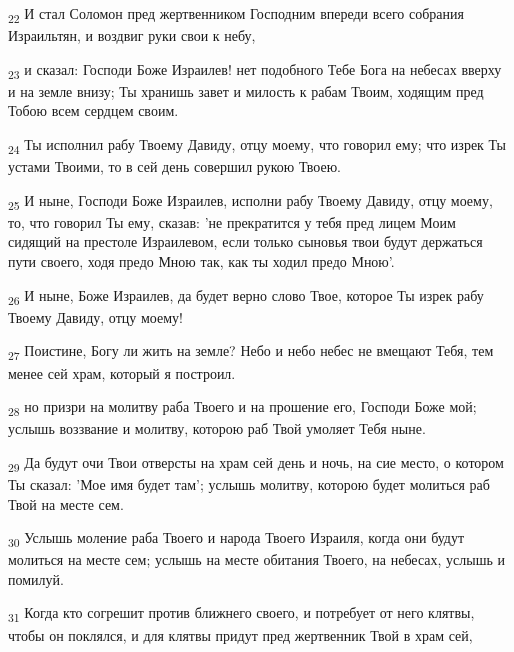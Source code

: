 \begin{tcolorbox}
\textsubscript{22} И стал Соломон пред жертвенником Господним впереди всего собрания Израильтян, и воздвиг руки свои к небу,
\end{tcolorbox}
\begin{tcolorbox}
\textsubscript{23} и сказал: Господи Боже Израилев! нет подобного Тебе Бога на небесах вверху и на земле внизу; Ты хранишь завет и милость к рабам Твоим, ходящим пред Тобою всем сердцем своим.
\end{tcolorbox}
\begin{tcolorbox}
\textsubscript{24} Ты исполнил рабу Твоему Давиду, отцу моему, что говорил ему; что изрек Ты устами Твоими, то в сей день совершил рукою Твоею.
\end{tcolorbox}
\begin{tcolorbox}
\textsubscript{25} И ныне, Господи Боже Израилев, исполни рабу Твоему Давиду, отцу моему, то, что говорил Ты ему, сказав: 'не прекратится у тебя пред лицем Моим сидящий на престоле Израилевом, если только сыновья твои будут держаться пути своего, ходя предо Мною так, как ты ходил предо Мною'.
\end{tcolorbox}
\begin{tcolorbox}
\textsubscript{26} И ныне, Боже Израилев, да будет верно слово Твое, которое Ты изрек рабу Твоему Давиду, отцу моему!
\end{tcolorbox}
\begin{tcolorbox}
\textsubscript{27} Поистине, Богу ли жить на земле? Небо и небо небес не вмещают Тебя, тем менее сей храм, который я построил.
\end{tcolorbox}
\begin{tcolorbox}
\textsubscript{28} но призри на молитву раба Твоего и на прошение его, Господи Боже мой; услышь воззвание и молитву, которою раб Твой умоляет Тебя ныне.
\end{tcolorbox}
\begin{tcolorbox}
\textsubscript{29} Да будут очи Твои отверсты на храм сей день и ночь, на сие место, о котором Ты сказал: 'Мое имя будет там'; услышь молитву, которою будет молиться раб Твой на месте сем.
\end{tcolorbox}
\begin{tcolorbox}
\textsubscript{30} Услышь моление раба Твоего и народа Твоего Израиля, когда они будут молиться на месте сем; услышь на месте обитания Твоего, на небесах, услышь и помилуй.
\end{tcolorbox}
\begin{tcolorbox}
\textsubscript{31} Когда кто согрешит против ближнего своего, и потребует от него клятвы, чтобы он поклялся, и для клятвы придут пред жертвенник Твой в храм сей,
\end{tcolorbox}
